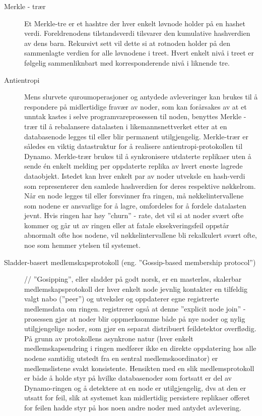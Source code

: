\begin{description}
  \item [Merkle - trær] Et Merkle-tre er et hashtre der hver enkelt løvnode holder på en hashet verdi. Foreldrenodens tilstandsverdi tilsvarer den kumulative hashverdien av dens barn. Rekursivt sett vil dette si at rotnoden holder på den sammenlagte verdien for alle løvnodene i treet. Hvert enkelt nivå i treet er følgelig sammenliknbart med korresponderende nivå i liknende tre.
  \item [Antientropi] Mens slurvete quroumoperasjoner og antydede avleveringer kan brukes til å respondere på midlertidige fravær av noder, som kan forårsakes av at et unntak kastes i selve programvareprosessen til noden, benyttes Merkle - trær til å rebalansere datalasten i likemannsnettverket etter at en databasenode legges til eller blir permanent utilgjengelig. Merkle-trær er således en viktig datastruktur for å realisere antientropi-protokollen til Dynamo. Merkle-trær brukes til å synkronisere utdaterte replikaer uten å sende én enkelt melding per oppdaterte replika av hvert eneste lagrede dataobjekt. Istedet kan hver enkelt par av noder utveksle en hash-verdi som representerer den samlede hashverdien for deres respektive nøkkelrom. Når en node legges til eller forsvinner fra ringen, må nøkkelintervallene som nodene er ansvarlige for å lagre, omfordeles for å fordele datalasten jevnt. Hvis ringen har høy ''churn'' - rate, det vil si at noder svært ofte kommer og går ut av ringen eller at fatale eksekveringsfeil oppstår abnormalt ofte hos nodene, vil nøkkelintervallene bli rekalkulert svært ofte, noe som hemmer ytelsen til systemet.
  \item [Sladder-basert medlemskapsprotokoll (eng. ''Gossip-based membership protocol'')] // ''Gosipping'', eller sladder på godt norsk, er en masterløs, skalerbar medlemskapsprotokoll der hver enkelt node jevnlig kontakter en tilfeldig valgt nabo (''peer'') og utveksler og oppdaterer egne registrerte medlemsdata om ringen. \cite{decandia2007} registrerer også at denne ''explicit node join'' - prosessen gjør at noder blir oppmerksomme både på nye noder og nylig utilgjengelige noder, som gjør en separat distribuert feildetektor overflødig. På grunn av protokollens asynkrone natur (hver enkelt medlemskapsendring i ringen medfører ikke en direkte oppdatering hos alle nodene samtidig utstedt fra en sentral medlemskoordinator) er medlemslistene svakt konsistente. Hensikten med en slik medlemsprotokoll er både å holde styr på hvilke databasenoder som fortsatt er del av Dynamo-ringen og å detektere at en node er utilgjengelig, dvs at den er utsatt for feil, slik at systemet kan midlertidig persistere replikaer offeret for feilen hadde styr på hos noen andre noder med antydet avlevering.

\end{description}
